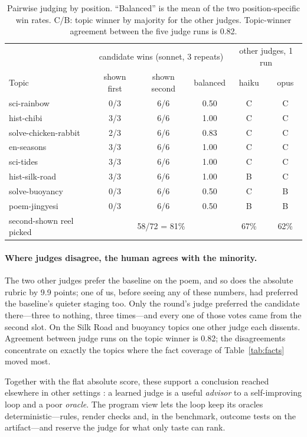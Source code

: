\documentclass[11pt]{article}
\begin{document}
\begin{table}[t]
\centering\small
\begin{tabular}{lccc|cc}
\toprule
 & \multicolumn{3}{c|}{candidate wins (sonnet, 3 repeats)} & \multicolumn{2}{c}{other judges, 1 run} \\
Topic & shown first & shown second & balanced & haiku & opus \\
\midrule
sci-rainbow & 0/3 & 6/6 & 0.50 & C & C \\
hist-chibi & 3/3 & 6/6 & 1.00 & C & C \\
solve-chicken-rabbit & 2/3 & 6/6 & 0.83 & C & C \\
en-seasons & 3/3 & 6/6 & 1.00 & C & C \\
sci-tides & 3/3 & 6/6 & 1.00 & C & C \\
hist-silk-road & 3/3 & 6/6 & 1.00 & B & C \\
solve-buoyancy & 0/3 & 6/6 & 0.50 & C & B \\
poem-jingyesi & 0/3 & 6/6 & 0.50 & B & B \\
\midrule
second-shown reel picked & \multicolumn{3}{c|}{58/72 = 81\%} & 67\% & 62\% \\
\bottomrule
\end{tabular}
\caption{Pairwise judging by position. ``Balanced'' is the mean of the two position-specific win
rates. C/B: topic winner by majority for the other judges. Topic-winner agreement between the five
judge runs is 0.82.}
\label{tab:position}
\end{table}

\paragraph{Where judges disagree, the human agrees with the minority.} The two other judges prefer the
baseline on the poem, and so does the absolute rubric by 9.9 points; one of us, before seeing any of
these numbers, had preferred the baseline's quieter staging too. Only the round's judge preferred the
candidate there---three to nothing, three times---and every one of those votes came from the second
slot. On the Silk Road and buoyancy topics one other judge each dissents. Agreement between judge runs
on the topic winner is 0.82; the disagreements concentrate on exactly the topics where the fact
coverage of Table~\ref{tab:facts} moved most.


Together with the flat absolute score, these support a conclusion reached elsewhere in other
settings \citep{notanoracle2026,moreconvincing2026,teachingmonster2026}: a learned judge is a useful
\emph{advisor} to a self-improving loop and a poor \emph{oracle}. The program view lets the loop keep
its oracles deterministic---rules, render checks and, in the benchmark, outcome tests on the
artifact---and reserve the judge for what only taste can rank.
\end{document}
